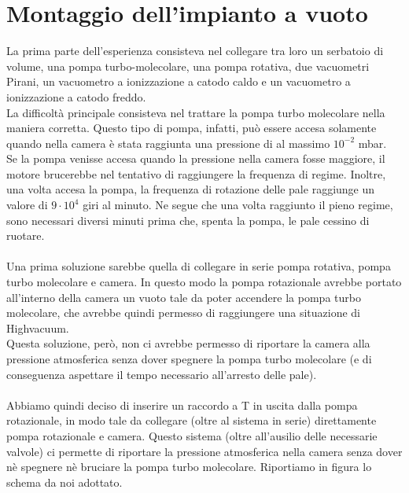 \documentclass[11pt]{article}
\begin{document}
\section{Montaggio dell'impianto a vuoto}
La prima parte dell'esperienza consisteva nel collegare tra loro un serbatoio di volume, una pompa turbo-molecolare, una pompa rotativa, due vacuometri Pirani, un vacuometro a ionizzazione a catodo caldo e un vacuometro a ionizzazione a catodo freddo. 
\\La difficoltà principale consisteva nel trattare la pompa turbo molecolare nella maniera corretta. Questo tipo di pompa, infatti, può essere accesa solamente quando nella camera è stata raggiunta una pressione di al massimo $10^{-2}$ mbar.
\\ Se la pompa venisse accesa quando la pressione nella camera fosse maggiore, il motore brucerebbe nel tentativo di raggiungere la frequenza di regime. Inoltre, una volta accesa la pompa, la frequenza di rotazione delle pale raggiunge un valore di $9\cdot10^{4}$ giri al minuto. Ne segue che una volta raggiunto il pieno regime, sono necessari diversi minuti prima che, spenta la pompa, le pale cessino di ruotare. 
\\
\\
 \hspace*{5mm}Una prima soluzione sarebbe quella di collegare in serie pompa rotativa, pompa turbo molecolare e camera. In questo modo la pompa rotazionale avrebbe portato all'interno della camera un vuoto tale da poter accendere la pompa turbo molecolare, che avrebbe quindi permesso di raggiungere una situazione di Highvacuum. 
\\Questa soluzione, però, non ci avrebbe permesso di riportare la camera alla pressione atmosferica senza dover spegnere la pompa turbo molecolare (e di conseguenza aspettare il tempo necessario all'arresto delle pale).
 \\ 
 \\
 \hspace*{5mm}Abbiamo quindi deciso di inserire un raccordo a T in uscita dalla pompa rotazionale, in modo tale da collegare (oltre al sistema in serie) direttamente pompa rotazionale e camera. Questo sistema (oltre all'ausilio delle necessarie valvole) ci permette di riportare la pressione atmosferica nella camera senza dover nè spegnere nè bruciare la pompa turbo molecolare. Riportiamo in figura lo schema da noi adottato.
\end{document}
